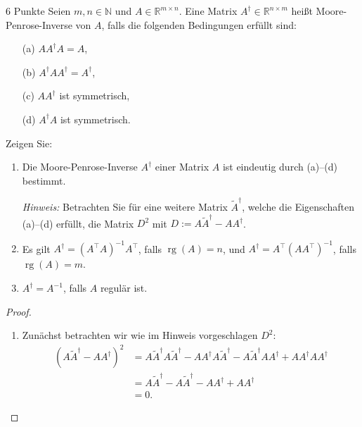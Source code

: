 \documentclass{problemset}
\author{Michael van Straten}
\begin{document}
\maketitle

\setcounter{problem}{1}

\begin{problem}{6 Punkte}
Seien \( m, n \in \mathbb{N} \) und \( A \in \mathbb{R}^{m \times n} \). Eine
Matrix \( A^\dagger \in \mathbb{R}^{n \times m} \) heißt Moore-Penrose-Inverse
von \( A \), falls die folgenden Bedingungen erfüllt sind:
\begin{enumerate}
    \item[(a)] \( AA^\dagger A = A \),
    \item[(b)] \( A^\dagger A A^\dagger = A^\dagger \),
    \item[(c)] \( AA^\dagger \) ist symmetrisch,
    \item[(d)] \( A^\dagger A \) ist symmetrisch.
\end{enumerate}
Zeigen Sie:
\begin{enumerate}
    \item Die Moore-Penrose-Inverse \( A^\dagger \) einer Matrix \( A \) ist
          eindeutig durch (a)–(d) bestimmt.

          \textit{Hinweis:}
          Betrachten Sie für eine weitere Matrix \( \tilde{A}^\dagger \),
          welche die Eigenschaften (a)–(d) erfüllt, die Matrix \( D^2 \) mit \(
          D := A \tilde{A}^\dagger - A A^\dagger \).
    \item Es gilt \( A^\dagger = (A^\top A)^{-1} A^\top \), falls \(
          \operatorname{rg}(A) = n \), und \( A^\dagger = A^\top (A
          A^\top)^{-1} \), falls \( \operatorname{rg}(A) = m \).
    \item \( A^\dagger = A^{-1} \), falls \( A \) regulär ist.
\end{enumerate}
\begin{proof}\leavevmode
    \begin{enumerate}
        \item \label{problem:1:i} Zunächst betrachten wir wie im Hinweis vorgeschlagen \( D^2 \):
              \begin{align*}
                  {(A \tilde{A}^\dagger - A A^\dagger)}^2
                   & = A \tilde{A}^\dagger A \tilde{A}^\dagger
                  - A A^\dagger A \tilde{A}^\dagger
                  - A \tilde{A}^\dagger A A^\dagger
                  + A A^\dagger A A^\dagger                      \\
                   & = A \tilde{A}^\dagger - A \tilde{A}^\dagger
                  - A A^\dagger + A A^\dagger                    \\
                   & = 0.
              \end{align*}


\end{enumerate}
\end{proof}
\end{problem}
\end{document}
